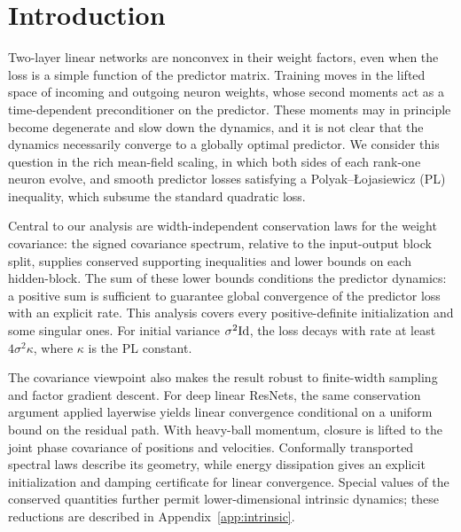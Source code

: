 
\section{Introduction}
\label{sec:intro}

Two-layer linear networks are nonconvex in their weight factors, even when the
loss is a simple function of the predictor matrix.  Training moves in the
lifted space of incoming and outgoing neuron weights, whose second moments act
as a time-dependent preconditioner on the predictor.  These moments may in
principle become degenerate and slow down the dynamics, and it is not clear that the dynamics necessarily converge to a globally optimal predictor.
We consider this question in the rich mean-field scaling, in which both sides of each rank-one neuron evolve, and
smooth predictor losses satisfying a Polyak--\L{}ojasiewicz (PL) inequality, which subsume the standard quadratic loss.

Central to our analysis are width-independent conservation laws for
the weight covariance: the signed covariance spectrum, relative to the input-output
block split, supplies conserved supporting inequalities and lower bounds on each hidden-block. The sum of these lower bounds conditions the predictor dynamics: a positive sum
is sufficient to guarantee global convergence of the predictor loss with an explicit rate. This analysis covers every positive-definite initialization and some singular ones.
For initial variance $\sigma^2 \mathrm{Id}$, the loss decays with rate at least $4\sigma^2\kappa$, where $\kappa$ is the PL constant.

The covariance viewpoint also makes the result robust to finite-width
sampling and factor gradient descent. For deep linear ResNets, the same
conservation argument applied layerwise yields linear convergence
conditional on a uniform bound on the residual path. With heavy-ball
momentum, closure is lifted to the joint phase covariance of positions
and velocities. Conformally transported spectral laws describe its
geometry, while energy dissipation gives an explicit initialization and
damping certificate for linear convergence. Special values of the
conserved quantities further permit lower-dimensional intrinsic dynamics;
these reductions are described in Appendix~\ref{app:intrinsic}.

